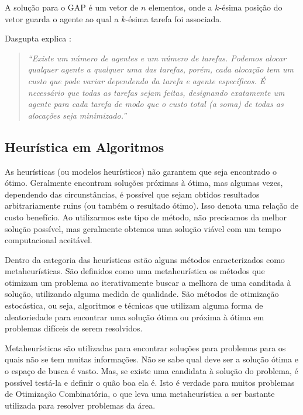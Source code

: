 \documentclass[portugues, brazil, a4paper,12pt]{article}
\begin{document}
		A solução para o GAP é um vetor de $n$ elementos, onde a $k$-ésima posição do vetor guarda o agente ao qual a $k$-ésima tarefa foi associada.
		
		Dasgupta explica \cite{Dasgupta2008}:
		
		\begin{quotation}
			{\it ``Existe um número de agentes e um número de tarefas. Podemos alocar qualquer agente a qualquer uma das tarefas, porém, cada alocação tem um custo que pode variar dependendo da tarefa e agente específicos. É necessário que todas as tarefas sejam feitas, designando exatamente um agente para cada tarefa de modo que o custo total (a soma) de todas as alocações seja minimizado.''}
		\end{quotation}
		
		
	\subsection{Heurística em Algoritmos}
		As heurísticas (ou modelos heurísticos) não garantem que seja encontrado o ótimo. Geralmente encontram soluções próximas à ótima, mas algumas vezes, dependendo das circunstâncias, é possível que sejam obtidos resultados arbitrariamente ruins (ou também o resultado ótimo). Isso denota uma relação de custo benefício. Ao utilizarmos este tipo de método, não precisamos da melhor solução possível, mas geralmente obtemos uma solução viável com um tempo computacional aceitável.
		
		Dentro da categoria das heurísticas estão alguns métodos caracterizados como metaheurísticas. São definidos como uma metaheurística os métodos que otimizam um problema ao iterativamente buscar a melhora de uma canditada à solução, utilizando alguma medida de qualidade. São métodos de otimização estocástica, ou seja, algoritmos e técnicas que utilizam alguma forma de aleatoriedade para encontrar uma solução ótima ou próxima à ótima em problemas difíceis de serem resolvidos.
		
		Metaheurísticas são utilizadas para encontrar soluções para problemas para os quais não se tem muitas informações. Não se sabe qual deve ser a solução ótima e o espaço de busca é vasto. Mas, se existe uma candidata à solução do problema, é possível testá-la e definir o quão boa ela é. Isto é verdade para muitos problemas de Otimização Combinatória, o que leva uma metaheurística a ser bastante utilizada para resolver problemas da área.


\end{document}

